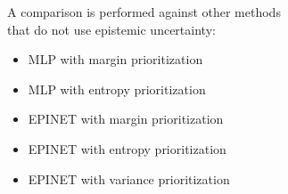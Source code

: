 \documentclass[preview]{standalone}
\begin{document}
\begin{center}
A comparison is performed against other methods \\ that do not use epistemic uncertainty:
            \begin{itemize}
            \item MLP with margin prioritization
            \item MLP with entropy prioritization
            \item EPINET with margin prioritization
            \item EPINET with entropy prioritization
            \item EPINET with variance prioritization
            \end{itemize}
\end{center}
\end{document}
